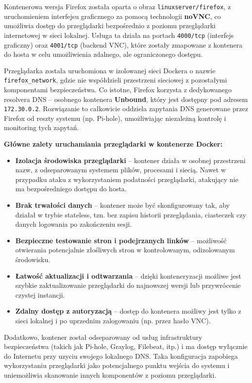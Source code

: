 \documentclass[
    left=2.5cm,         %
    right=2.5cm,        %
    top=2.5cm,          %
    bottom=3cm,         %
    bindingoffset=6mm,  %
    nohyphenation=true %
]{eiti/eiti-thesis} %
\begin{document}
Kontenerowa wersja Firefox została oparta o obraz \texttt{linuxserver/firefox}, z uruchomieniem interfejsu graficznego za pomocą technologii \textbf{noVNC}, co umożliwia dostęp do przeglądarki bezpośrednio z poziomu przeglądarki internetowej w sieci lokalnej. Usługa ta działa na portach \texttt{4000/tcp} (interfejs graficzny) oraz \texttt{4001/tcp} (backend VNC), które zostały zmapowane z kontenera do hosta w celu umożliwienia zdalnego, ale ograniczonego dostępu.

Przeglądarka została uruchomiona w izolowanej sieci Dockera o nazwie \texttt{firefox\_network}, gdzie nie współdzieli przestrzeni sieciowej z pozostałymi komponentami bezpieczeństwa. Co istotne, Firefox korzysta z dedykowanego resolvera DNS – osobnego kontenera \textbf{Unbound}\cite{config-unbound-firefox}, który jest dostępny pod adresem \texttt{172.30.0.2}. Rozwiązanie to całkowicie oddziela zapytania DNS generowane przez Firefox od reszty systemu (np. Pi-hole), umożliwiając niezależną kontrolę i monitoring tych zapytań.

\textbf{Główne zalety uruchamiania przeglądarki w kontenerze Docker:}
\begin{itemize}
    \item \textbf{Izolacja środowiska przeglądarki} – kontener działa w osobnej przestrzeni nazw, z odseparowanym systemem plików, procesami i siecią. Nawet w przypadku ataku z wykorzystaniem podatności przeglądarki, atakujący nie ma bezpośredniego dostępu do hosta.
    \item \textbf{Brak trwałości danych} – kontener może być skonfigurowany tak, aby działał w trybie stateless, tzn. bez zapisu historii przeglądania, ciasteczek czy danych logowania po zakończeniu sesji.
    \item \textbf{Bezpieczne testowanie stron i podejrzanych linków} – możliwość otwierania potencjalnie złośliwych stron w kontrolowanym, odizolowanym środowisku.
    \item \textbf{Łatwość aktualizacji i odtwarzania} – dzięki konteneryzacji możliwe jest szybkie zaktualizowanie przeglądarki do najnowszej wersji lub przywrócenie czystej instancji.
    \item \textbf{Zdalny dostęp z autoryzacją} – dostęp do kontenera możliwy jest tylko z sieci lokalnej i po uprzednim zalogowaniu (np. przez hasło VNC).
\end{itemize}

Dodatkowo, kontener został odseparowany od usług infrastruktury bezpieczeństwa (takich jak Pi-hole, Graylog, Filebeat, itp.) i ma dostęp wyłącznie do Internetu przy uzyciu swojego lokalnego DNS. Taka konfiguracja zapobiega wykorzystaniu przeglądarki jako potencjalnego punktu wejścia do systemu i uniemożliwia skanowanie innych komponentów z poziomu przeglądarki.
\end{document}
